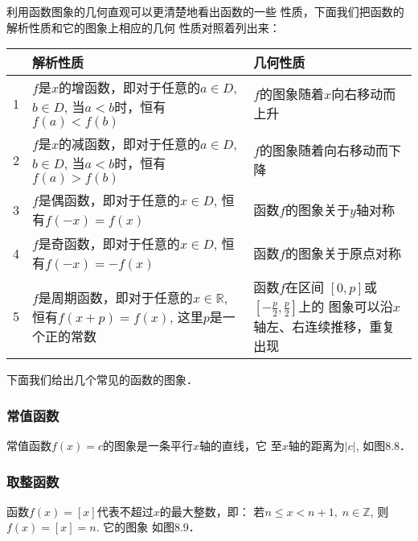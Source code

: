 利用函数图象的几何直观可以更清楚地看出函数的一些
性质，下面我们把函数的解析性质和它的图象上相应的几何
性质对照着列出来：
\begin{center}
\begin{tabular}{cp{}p{}}
    \hline
    &  解析性质  &几何性质\\
    \hline
    1  &$f$是$x$的增函数，即对于任意的$a\in D$, $b\in D$, 当$a<b$时，恒有$f(a)<
f(b)$  &$f$的图象随着$x$向右移动而上升\\
2&$f$是$x$的减函数，即对于任意的$a\in D$, $b\in D$, 当$a<b$时，恒有$f(a)>f(b)$ &$f$的图象随着向右移动而下降\\
3&$f$是偶函数，即对于任意的$x\in D$, 恒有$f(-x)=f(x)$ &函数$f$的图象关于$y$轴对称\\
4& $f$是奇函数，即对于任意的$x\in D$, 恒有$f(-x)=-f(x)$ & 函数$f$的图象关于原点对称\\
5 & $f$是周期函数，即对于任意的$x\in\mathbb{R}$, 恒有$f(x+p)=f(x)$, 这里$p$是一个正的常数& 函数$f$在区间
$[0,p]$或$\left[-\frac{p}{2},\frac{p}{2}\right]$上的
图象可以沿$x$轴左、右连续推移，重复出现\\
\hline
\end{tabular}
\end{center}

下面我们给出几个常见的函数的图象．

\subsubsection{常值函数}
常值函数$f(x)=c$的图象是一条平行$x$轴的直线，它
至$x$轴的距离为$|c|$, 如图8.8．

\subsubsection{取整函数}
函数$f(x)=[x]$代表不超过$x$的最大整数，即：
若$n\le x<n+1,\; n\in\mathbb{Z}$, 则$f(x)=[x]=n$. 它的图象
如图8.9．

